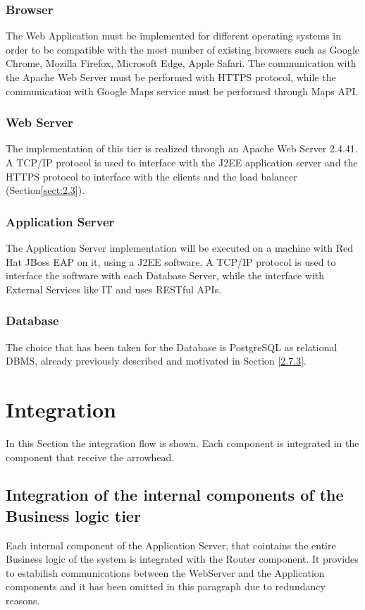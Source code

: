 \documentclass[../DD.tex]{subfiles}
\begin{document}
\subsubsection{Browser}
The Web Application must be implemented for different operating systems in order to be compatible with the most number of existing browsers such as Google Chrome, Mozilla Firefox, Microsoft Edge, Apple Safari. The communication with the Apache Web Server must be performed with HTTPS protocol, while the communication with Google Maps service must be performed through Maps API.

\subsubsection{Web Server}
The implementation of this tier is realized through an Apache Web Server 2.4.41. A TCP/IP protocol is used to interface with the J2EE application server and the HTTPS protocol to interface with the clients and the load balancer (Section\ref{sect:2.3}). 

\subsubsection{Application Server}
The Application Server implementation will be executed on a machine with Red Hat JBoss EAP on it, using a J2EE software. A TCP/IP protocol is used to interface the software with each Database Server, while the interface with External Services like  IT and  uses RESTful APIs.

\subsubsection{Database}
The choice that has been taken for the Database is PostgreSQL as relational DBMS, already previously described and motivated in Section \ref{2.7.3}.

\section{Integration\label{5.3}}

In this Section the integration flow is shown. Each component is integrated in the component that receive the arrowhead.

\subsection{Integration of the internal components of the Business logic tier}
Each internal component of the Application Server, that cointains the entire Business logic of the system is integrated with the Router component. It provides to estabilish communications between the WebServer and the Application components and it has been omitted in this paragraph due to redundancy reasons.
\end{document}
